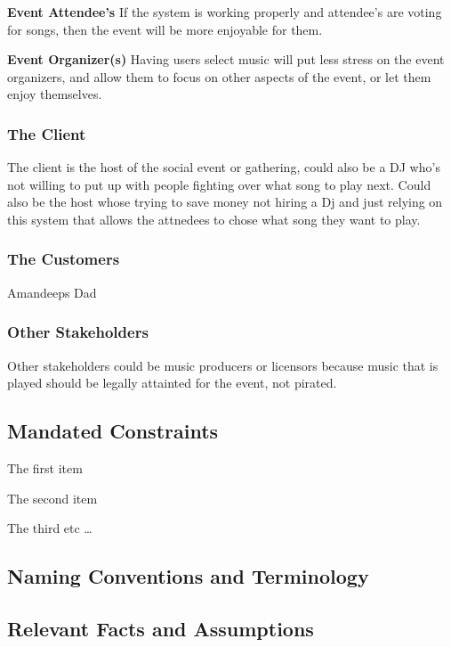 \documentclass[12pt, titlepage]{article}
\begin{document}
\textbf{Event Attendee's}
If the system is working properly and attendee's are voting for songs, then
the event will be more enjoyable for them.

\textbf{Event Organizer(s)}
Having users select music will put less stress on the event organizers, and
allow them to focus on other aspects of the event, or let them enjoy
themselves.

\subsubsection{The Client}
The client is the host of the social event or gathering, could also be a DJ
who's not willing to put up with people fighting over what song to play next.
Could also be the host whose trying to save money not hiring a Dj and just
relying on this system that allows the attnedees to chose what song they want
to play.

\subsubsection{The Customers}
Amandeeps Dad

\subsubsection{Other Stakeholders}
Other stakeholders could be music producers or licensors because music that is
played should be legally attainted for the event, not pirated.

\subsection{Mandated Constraints}

\begin{list_type}
\item The first item
\item The second item
\item The third etc \ldots
\end{list_type}

\subsection{Naming Conventions and Terminology}

\subsection{Relevant Facts and Assumptions}
\end{document}
